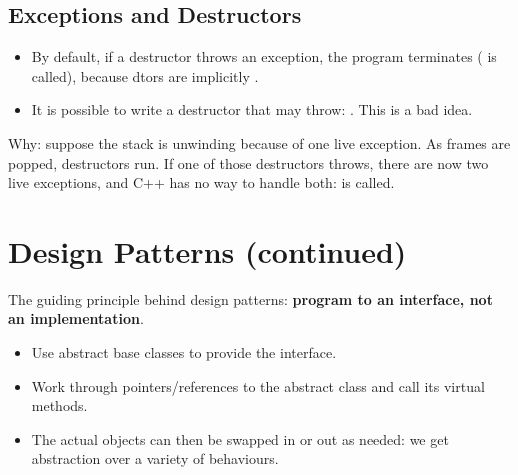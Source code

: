 \subsection{Exceptions and Destructors}
\begin{itemize}
  \item By default, if a destructor throws an exception, the program terminates
        ( is called), because dtors are implicitly
        .
  \item It is possible to write a destructor that may throw:
        . This is a bad
        idea.
\end{itemize}
Why: suppose the stack is unwinding because of one live exception. As frames are
popped, destructors run. If one of those destructors throws, there are now two
live exceptions, and C++ has no way to handle both:  is
called.

\section{Design Patterns (continued)}
The guiding principle behind design patterns: \textbf{program to an interface,
not an implementation}.
\begin{itemize}
  \item Use abstract base classes to provide the interface.
  \item Work through pointers/references to the abstract class and call its
        virtual methods.
  \item The actual objects can then be swapped in or out as needed: we get
        abstraction over a variety of behaviours.
\end{itemize}

